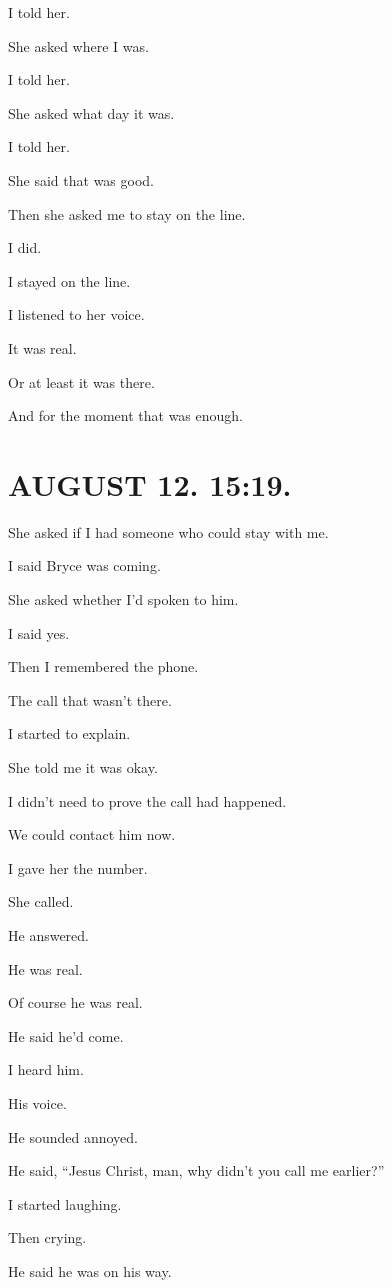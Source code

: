 \documentclass[11pt,oneside]{book}
\begin{document}
I told her.

She asked where I was.

I told her.

She asked what day it was.

I told her.

She said that was good.

Then she asked me to stay on the line.

I did.

I stayed on the line.

I listened to her voice.

It was real.

Or at least it was there.

And for the moment that was enough.

\section*{AUGUST 12. 15:19.}

She asked if I had someone who could stay with me.

I said Bryce was coming.

She asked whether I'd spoken to him.

I said yes.

Then I remembered the phone.

The call that wasn't there.

I started to explain.

She told me it was okay.

I didn't need to prove the call had happened.

We could contact him now.

I gave her the number.

She called.

He answered.

He was real.

Of course he was real.

He said he'd come.

I heard him.

His voice.

He sounded annoyed.

He said, ``Jesus Christ, man, why didn't you call me earlier?''

I started laughing.

Then crying.

He said he was on his way.
\end{document}
